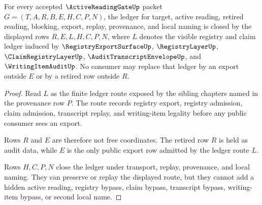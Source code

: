 \begin{theorem}
\label{thm:active-reading-gate-ledger-closure-obligation}
For every accepted $\ActiveReadingGateUp$ packet $G=(T,A,R,B,E,H,C,P,N)$, the ledger for target, active reading, retired reading, blocking, export, replay, provenance, and local naming is closed by the displayed rows $R,E,L,H,C,P,N$, where $L$ denotes the visible registry and claim ledger induced by $\RegistryExportSurfaceUp$, $\RegistryLayerUp$, $\ClaimRegistryLayerUp$, $\AuditTranscriptEnvelopeUp$, and $\WritingItemAuditUp$. No consumer may replace that ledger by an export outside $E$ or by a retired row outside $R$.
\end{theorem}
\begin{proof}
Read $L$ as the finite ledger route exposed by the sibling chapters named in the provenance row $P$. The route records registry export, registry admission, claim admission, transcript replay, and writing-item legality before any public consumer sees an export.

Rows $R$ and $E$ are therefore not free coordinates. The retired row $R$ is held as audit data, while $E$ is the only public export row admitted by the ledger route $L$.

Rows $H,C,P,N$ close the ledger under transport, replay, provenance, and local naming. They can preserve or replay the displayed route, but they cannot add a hidden active reading, registry bypass, claim bypass, transcript bypass, writing-item bypass, or second local name.
\end{proof}

